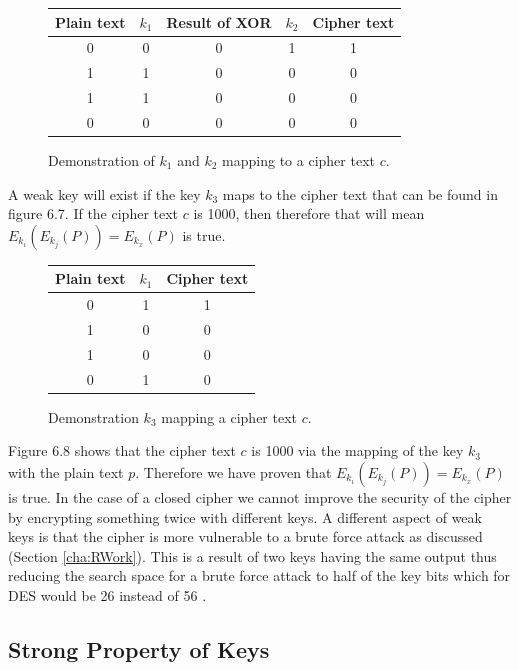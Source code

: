 \documentclass[11pt,a4paper, notitlepage]{report}
\begin{document}
\begin{figure}[H]
\centering
\begin{tabular}{|c|c|c|c|c|}
\hline
Plain text & $k_{1}$ & Result of XOR & $k_{2}$ & Cipher text\\ \hline
0 & 0 & 0 & 1 & 1 \\ \hline
1 & 1 & 0 & 0 & 0 \\ \hline
1 & 1 & 0 & 0 & 0 \\ \hline
0 & 0 & 0 & 0 & 0 \\ \hline
\end{tabular}
\caption{Demonstration of $k_{1}$ and $k_{2}$ mapping to a cipher text $c$.}
\end{figure}
A weak key will exist if the key $k_{3}$ maps to the cipher text that can be found in figure 6.7. If the cipher text $c$ is 1000, then therefore that will mean $E_{k_i}(E_{k_{j}}(P)) = E_{k_{x}}(P)$ is true. 

\begin{figure}[H]
\centering
\begin{tabular}{|c|c|c|}
\hline
Plain text & $k_{1}$ & Cipher text\\ \hline
0 & 1 & 1\\ \hline
1 & 0 & 0\\ \hline
1 & 0 & 0\\ \hline
0 & 1 & 0\\ \hline
\end{tabular}
\caption{Demonstration $k_{3}$ mapping a cipher text $c$.}
\end{figure}

Figure 6.8 shows that the cipher text $c$ is 1000 via the mapping of the key $k_{3}$ with the plain text $p$. Therefore we have proven that $E_{k_i}(E_{k_{j}}(P)) = E_{k_{x}}(P)$ is true. 
In the case of a closed cipher we cannot improve the security of the cipher by encrypting something twice with different keys. A different aspect of weak keys is that the cipher is more vulnerable to a brute force attack as discussed (Section \ref{cha:RWork}). This is a result of two keys having the same output thus reducing the search space for a brute force attack to half of the key bits which for DES would be 26 instead of 56 \cite{Fabio2000LogicalSAT}. 








\subsection{Strong Property of Keys}
\label{subsec:StrongKeys}
\end{document}
